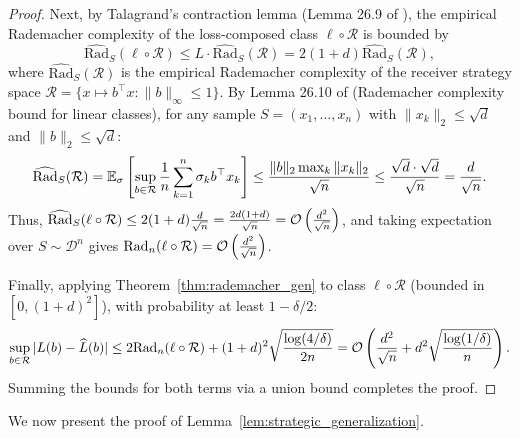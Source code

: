 \begin{proof}
Next, by Talagrand's contraction lemma (Lemma 26.9 of \citealp{shalevshwartz2014understanding}), the empirical Rademacher complexity of the loss-composed class $\ell \circ \mathcal{R}$ is bounded by
\begin{equation*}
    \widehat{\mathrm{Rad}}_S(\ell \circ \mathcal{R}) \le L \cdot \widehat{\mathrm{Rad}}_S(\mathcal{R}) = 2(1+d) \widehat{\mathrm{Rad}}_S(\mathcal{R}),
\end{equation*}
where $\widehat{\mathrm{Rad}}_S(\mathcal{R})$ is the empirical Rademacher complexity of the receiver strategy space $\mathcal{R} = \{ x \mapsto b^\top x : \|b\|_\infty \le 1 \}$. By Lemma 26.10 of \citet{shalevshwartz2014understanding} (Rademacher complexity bound for linear classes), for any sample $S = (x_1, \dots, x_n)$ with $\|x_k\|_2 \le \sqrt{d}$ and $\|b\|_2 \le \sqrt{d}$:
\begin{equation*}
    \widehat{\mathrm{Rad}}_S(\mathcal{R}) = \mathbb{E}_\sigma \left[ \sup_{b \in \mathcal{R}} \frac{1}{n}\sum_{k=1}^n \sigma_k b^\top x_k \right] \le \frac{\|b\|_2 \max_k \|x_k\|_2}{\sqrt{n}} \le \frac{\sqrt{d} \cdot \sqrt{d}}{\sqrt{n}} = \frac{d}{\sqrt{n}}.
\end{equation*}
Thus, $\widehat{\mathrm{Rad}}_S(\ell \circ \mathcal{R}) \le 2(1+d) \frac{d}{\sqrt{n}} = \frac{2d(1+d)}{\sqrt{n}} = \mathcal{O}\left( \frac{d^2}{\sqrt{n}} \right)$, and taking expectation over $S \sim \mathcal{D}^n$ gives $\mathrm{Rad}_n(\ell \circ \mathcal{R}) = \mathcal{O}\left( \frac{d^2}{\sqrt{n}} \right)$.

Finally, applying Theorem~\ref{thm:rademacher_gen} to class $\ell \circ \mathcal{R}$ (bounded in $[0, (1+d)^2]$), with probability at least $1 - \delta/2$:
\begin{equation*}
    \sup_{b \in \mathcal{R}} |L(b) - \widehat{L}(b)| \le 2\mathrm{Rad}_n(\ell \circ \mathcal{R}) + (1+d)^2 \sqrt{\frac{\log(4/\delta)}{2n}} = \mathcal{O}\left( \frac{d^2}{\sqrt{n}} + d^2\sqrt{\frac{\log(1/\delta)}{n}} \right).
\end{equation*}
Summing the bounds for both terms via a union bound completes the proof.
\end{proof}

We now present the proof of Lemma~\ref{lem:strategic_generalization}.

